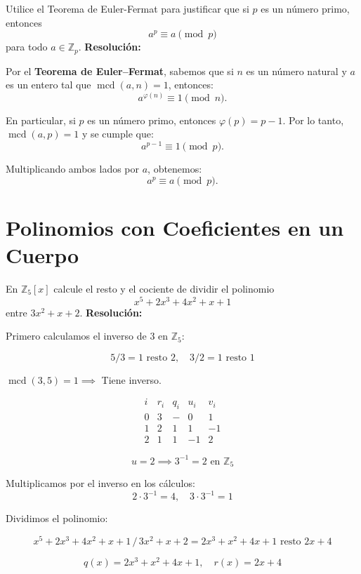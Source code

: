 \documentclass[a4paper,12pt]{article}
\begin{document}
\begin{ejercicio}[title=Ejercicio 50]
Utilice el Teorema de Euler-Fermat para justificar que si $p$ es un número primo, entonces
\[
a^p \equiv a \pmod{p}
\]
para todo $a \in \mathbb{Z}_p$.
\tcblower
\textbf{Resolución:}

Por el \textbf{Teorema de Euler–Fermat}, sabemos que si $n$ es un número natural y $a$ es un entero tal que $\operatorname{mcd}(a,n) = 1$, entonces:
\[
a^{\varphi(n)} \equiv 1 \pmod{n}.
\]

En particular, si $p$ es un número primo, entonces $\varphi(p) = p - 1$. Por lo tanto, $\operatorname{mcd}(a,p) = 1$ y se cumple que:
\[
a^{p-1} \equiv 1 \pmod{p}.
\]

Multiplicando ambos lados por $a$, obtenemos:
\[
\boxed{a^p \equiv a \pmod{p}}.
\]
\end{ejercicio}

\section{Polinomios con Coeficientes en un Cuerpo}

\begin{ejercicio}[title=Ejercicio 43]
En $\mathbb{Z}_5[x]$ calcule el resto y el cociente de dividir el polinomio
\[
x^5 + 2x^3 + 4x^2 + x + 1
\]
entre $3x^2 + x + 2$.
\tcblower
\textbf{Resolución:}

Primero calculamos el inverso de $3$ en $\mathbb{Z}_5$:

\[
5 / 3 = 1 \text{ resto } 2, \quad 3 / 2 = 1 \text{ resto } \boxed{1}
\]

\(\operatorname{mcd}(3,5) = 1 \implies\) Tiene inverso.

\[
\begin{array}{c|c|c|c|c}
i & r_i & q_i & u_i & v_i \\
\hline
0 & 3 & - & 0 & 1 \\
1 & 2 & 1 & 1 & -1 \\
2 & \boxed{1} & 1 & -1 & 2
\end{array}
\]

\[
u = 2 \implies 3^{-1} = 2 \text{ en } \mathbb{Z}_5
\]

Multiplicamos por el inverso en los cálculos:
\[
2 \cdot 3^{-1} = 4, \quad 3 \cdot 3^{-1} = 1
\]

Dividimos el polinomio:

\[
x^5 + 2x^3 + 4x^2 + x + 1 \, / \, 3x^2 + x + 2 = 2x^3 + x^2 + 4x + 1 \text{ resto } 2x + 4
\]

\[
\boxed{
q(x) = 2x^3 + x^2 + 4x + 1, \quad r(x) = 2x + 4
}
\]

\end{ejercicio}
\end{document}
